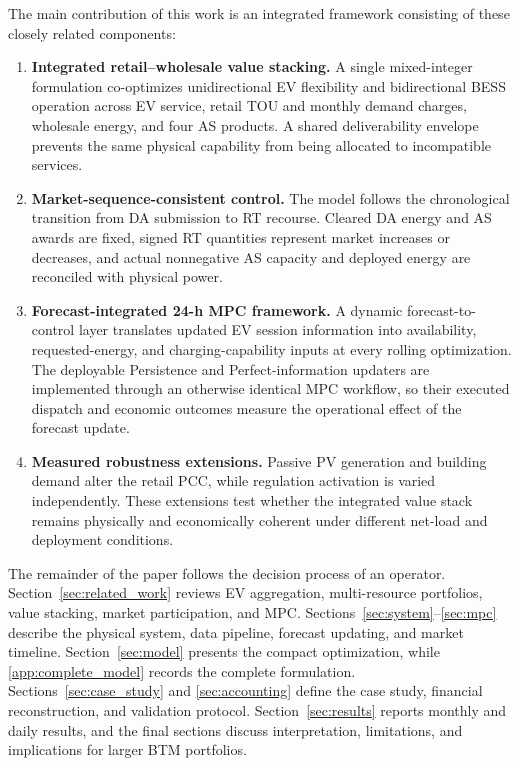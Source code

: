 \documentclass[final,5p,times]{elsarticle}
\begin{document}
The main contribution of this work is an integrated framework consisting of these closely related components:
\begin{enumerate}
  \item \textbf{Integrated retail--wholesale value stacking.} A single mixed-integer formulation co-optimizes unidirectional EV flexibility and bidirectional BESS operation across EV service, retail TOU and monthly demand charges, wholesale energy, and four AS products. A shared deliverability envelope prevents the same physical capability from being allocated to incompatible services.
  \item \textbf{Market-sequence-consistent control.} The model follows the chronological transition from DA submission to RT recourse. Cleared DA energy and AS awards are fixed, signed RT quantities represent market increases or decreases, and actual nonnegative AS capacity and deployed energy are reconciled with physical power.
  \item \textbf{Forecast-integrated 24-h MPC framework.} A dynamic forecast-to-control layer translates updated EV session information into availability, requested-energy, and charging-capability inputs at every rolling optimization. The deployable Persistence and Perfect-information updaters are implemented through an otherwise identical MPC workflow, so their executed dispatch and economic outcomes measure the operational effect of the forecast update.
  \item \textbf{Measured robustness extensions.} Passive PV generation and building demand alter the retail PCC, while regulation activation is varied independently. These extensions test whether the integrated value stack remains physically and economically coherent under different net-load and deployment conditions.
  
\end{enumerate}

The remainder of the paper follows the decision process of an operator. Section~\ref{sec:related_work} reviews EV aggregation, multi-resource portfolios, value stacking, market participation, and MPC. Sections~\ref{sec:system}--\ref{sec:mpc} describe the physical system, data pipeline, forecast updating, and market timeline. Section~\ref{sec:model} presents the compact optimization, while \ref{app:complete_model} records the complete formulation. Sections~\ref{sec:case_study} and \ref{sec:accounting} define the case study, financial reconstruction, and validation protocol. Section~\ref{sec:results} reports monthly and daily results, and the final sections discuss interpretation, limitations, and implications for larger BTM portfolios.
\end{document}
